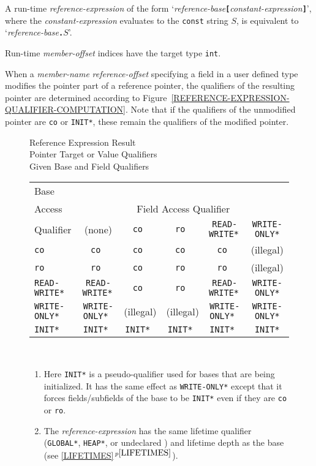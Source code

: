 \documentclass[12pt]{article}
\newcommand{\TT}[1]{{\tt \bfseries #1}}
\newcommand{\itemref}[1]{\ref{#1}$\,^{p\pageref{#1}}$}
\newlength{\figurewidth}
\newenvironment{boxedfigure}[1][!btp]%
	{\begin{figure*}[#1]
	 \begin{lrbox}{\figurebox}
	 \begin{minipage}{\figurewidth}

	 \vspace*{1ex}}%
	{
	 \vspace*{1ex}

	 \end{minipage}
	 \end{lrbox}

	 \centering
	 \fbox{\hspace*{0.1in}\usebox{\figurebox}\hspace*{0.1in}}
	 \end{figure*}}
\begin{document}
A run-time {\em reference-expression} of the form
`{\em reference-base}\TT{[}{\em constant-expression}\TT{]}',
where the {\em constant-expression} evaluates to the {\tt const}
string $S$, is equivalent to `{\em reference-base}\TT{.}$S$'.

Run-time {\em member-offset} indices have the target type {\tt int}.


When a {\em member-name} {\em reference-offset} specifying a field
in a user defined type modifies the pointer part of
a reference pointer, the qualifiers of the resulting
pointer are determined according to
Figure~\ref{REFERENCE-EXPRESSION-QUALIFIER-COMPUTATION}.%
\label{QUALIFIER-COMPUTATION}
Note that if the qualifiers of the unmodified pointer
are {\tt co} or {\tt *INIT*}, these remain the qualifiers of the
modified pointer.

\begin{boxedfigure}[!t]
\newcommand{\tts}{\tt \small}
\begin{center}
Reference Expression Result \\
Pointer Target or Value Qualifiers \\
Given Base and Field Qualifiers
\\[1ex]
\begin{tabular}{|l|c|c|c|c|c|}
\multicolumn{1}{l}{Base}	\\
\multicolumn{1}{l}{Access}	& \multicolumn{5}{c}{Field Access Qualifier}
\\\cline{2-6}
\multicolumn{1}{l|}{Qualifier}
       & (none) & \tt co & \tt ro & \tts *READ-WRITE* & \tts *WRITE-ONLY*
\\\hline
\tt co & \tt co & \tt co & \tt co & \tt co & (illegal)
\\\hline
\tt ro & \tt ro & \tt co & \tt ro & \tt ro & (illegal)
\\\hline
\tts *READ-WRITE* & \tts *READ-WRITE* & \tt co & \tt ro & \tts *READ-WRITE*
		  & \tts *WRITE-ONLY*
\\\hline
\tts *WRITE-ONLY* & \tts *WRITE-ONLY* & (illegal) & (illegal)
                 & \tts *WRITE-ONLY* & \tts *WRITE-ONLY*
\\\hline
\tts *INIT* & \tts *INIT* & \tts *INIT* & \tts *INIT* & \tts *INIT*
            & \tts *INIT*
\\\hline
\end{tabular}
\\[1ex]
\begin{minipage}{6.0in}
\raggedright
\begin{enumerate}
\item Here\label{INIT-FORCING}
{\tt *INIT*} is a pseudo-qualifier used for bases
that are being initialized.  It has the same effect as {\tt *WRITE-ONLY*}
except that it forces fields/subfields of the base to be {\tt *INIT*}
even if they are {\tt co} or {\tt ro}.
\item The {\em reference-expression} has the same lifetime qualifier
({\tt *GLOBAL*}, {\tt *HEAP*}, or undeclared )
and lifetime depth as the base (see \itemref{LIFETIMES}).
\end{enumerate}
\end{minipage}
\end{center}


\end{boxedfigure}
\end{document}
